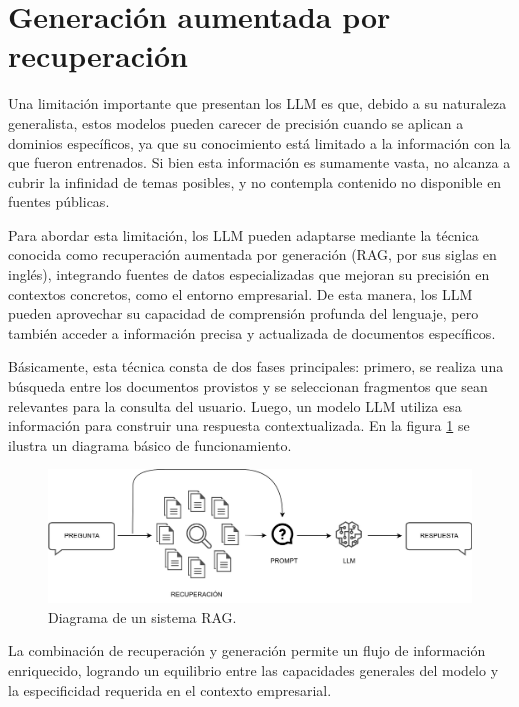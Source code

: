 \section{Generación aumentada por recuperación}

Una limitación importante que presentan los LLM es que, debido a su naturaleza generalista, estos modelos pueden 
carecer de precisión cuando se aplican a dominios específicos, ya que su conocimiento está limitado a la información 
con la que fueron entrenados. Si bien esta información es sumamente vasta, no alcanza a cubrir la infinidad de temas 
posibles, y no contempla contenido no disponible en fuentes públicas.

Para abordar esta limitación, los LLM pueden adaptarse mediante la técnica conocida como recuperación aumentada por 
generación (RAG, por sus siglas en inglés), integrando fuentes de datos especializadas que mejoran su precisión 
en contextos concretos, como el entorno empresarial. De esta manera, los LLM pueden aprovechar su capacidad de 
comprensión profunda del lenguaje, pero también acceder a información precisa y actualizada de documentos específicos.

Básicamente, esta técnica consta de dos fases principales: primero, se realiza una búsqueda entre los documentos
provistos y se seleccionan fragmentos que sean relevantes para la consulta del usuario. Luego, un modelo LLM
utiliza esa información para construir una respuesta contextualizada. En la figura \ref{fig:rag} se ilustra
un diagrama básico de funcionamiento.

\vspace{3mm}

\begin{figure}[ht]
	\centering
	\includegraphics[scale=.24]{./Figures/rag.png}
	\caption{Diagrama de un sistema RAG.}
	\label{fig:rag}
\end{figure}

La combinación de recuperación y generación permite un flujo de información enriquecido, logrando un equilibrio 
entre las capacidades generales del modelo y la especificidad requerida en el contexto empresarial.

